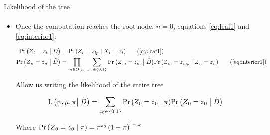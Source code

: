 \documentclass[9pt,handout,ignorenonframetext,]{beamer}
\newcommand{\Prcond}[2]{{\mbox{Pr}\left(#1\vphantom{#2}\;\right|\left.\vphantom{#1}#2\right)}}
\newcommand{\likelihood}[2]{\mbox{L}\left(#1\vphantom{#2}\right|\left.\vphantom{#1}#2\right)}
\newcommand{\aphylo}{D{}}      %
\newcommand{\aphyloObs}{\tilde \aphylo{}} %
\newcommand{\Ann}{Z{}} %
\newcommand{\ann}{z{}} %
\newcommand{\AnnObs}{X{}}
\newcommand{\annObs}{x{}}
\begin{document}
\begin{frame}[t,label=likelihood]{Likelihood of the tree}

\framesubtitle{\hyperlink{peelingalgorithm<2>}{}}

\begin{itemize}
\item
  Once the computation reaches the root node, \(n=0\), equations
  \eqref{eq:leaf1} and \eqref{eq:interior1}:

  \tiny

  \begin{align*}
  \Prcond{\Ann_l = \ann_l}{\aphyloObs} & = \Prcond{\Ann_{l} = \ann_{lp}}{\AnnObs_{l} = \annObs_{l}} \tag{\ref{eq:leaf1}}\\
  \Prcond{\Ann_n = \ann_n}{\aphyloObs}  & = 
  \prod_{m \in O(n)} \sum_{\ann_m \in \{0,1\}} \Prcond{\Ann_m = \ann_m}{\aphyloObs}  
  \Prcond{\Ann_{m} = \ann_{mp}}{\Ann_{n} = \ann_{n}} \tag{\ref{eq:interior1}}
  \end{align*}

  \normalsize

  Allow us writing the likelihood of the entire tree

  \begin{equation}
  \label{eq:l}
  \likelihood{\psi, \mu, \pi}{\aphyloObs} = \sum_{\ann_0\in\{0,1\}}\Prcond{\Ann_0=\ann_0}{\pi}\Prcond{\Ann_0=\ann_0}{\aphyloObs}
  \end{equation}

  Where
  \(\Prcond{\Ann_0=\ann_0}{\pi} = \pi^{\ann_{0}}\left(1 - \pi\right)^{1 - \ann_{0}}\)
\end{itemize}

\end{frame}
\end{document}
